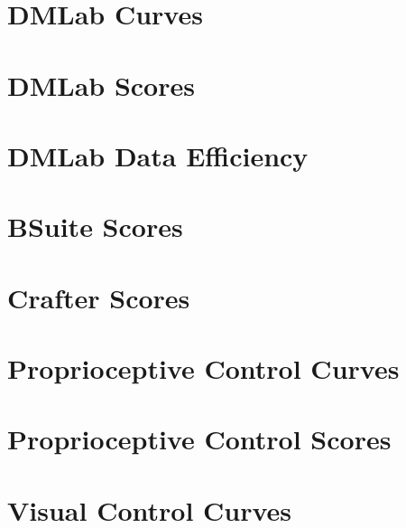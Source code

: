 \section{DMLab Curves}
\vspace*{-1ex}

\vspace*{-2ex}
\section{DMLab Scores}
\vspace*{-2ex}

\restoregeometry
\clearpage

\section{DMLab Data Efficiency}
\label{sec:dmlab_eff}


\clearpage

\section{BSuite Scores}
\vspace{-2ex}

\vspace{-2ex}

\clearpage

\section{Crafter Scores}


\restoregeometry
\clearpage

\section{Proprioceptive Control Curves}

\clearpage
\section{Proprioceptive Control Scores}

\clearpage

\thispagestyle{blank}
\section{Visual Control Curves}

\restoregeometry
\clearpage
